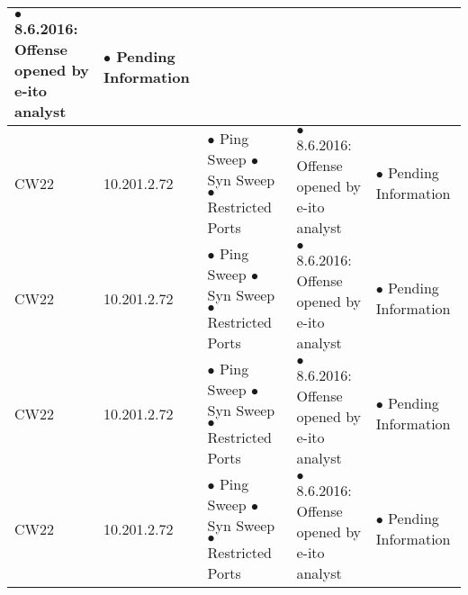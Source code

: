 \begin{center}
\begin{longtable}{|p{2cm}|p{}|p{4cm}|p{6cm}|p{4cm}|}
$\bullet$ 8.6.2016: Offense opened by e-ito analyst & %

$\bullet$ Pending Information %
\\
\hline %
CW22 & %

10.201.2.72 & %

$\bullet$ Ping Sweep \newline %
$\bullet$ Syn Sweep \newline
$\bullet$ Restricted Ports &

$\bullet$ 8.6.2016: Offense opened by e-ito analyst & %

$\bullet$ Pending Information %
\\
\hline %
CW22 & %

10.201.2.72 & %

$\bullet$ Ping Sweep \newline %
$\bullet$ Syn Sweep \newline
$\bullet$ Restricted Ports &

$\bullet$ 8.6.2016: Offense opened by e-ito analyst & %

$\bullet$ Pending Information %
\\
\hline %
CW22 & %

10.201.2.72 & %

$\bullet$ Ping Sweep \newline %
$\bullet$ Syn Sweep \newline
$\bullet$ Restricted Ports &

$\bullet$ 8.6.2016: Offense opened by e-ito analyst & %

$\bullet$ Pending Information %
\\
\hline %
CW22 & %

10.201.2.72 & %

$\bullet$ Ping Sweep \newline %
$\bullet$ Syn Sweep \newline
$\bullet$ Restricted Ports &

$\bullet$ 8.6.2016: Offense opened by e-ito analyst & %

$\bullet$ Pending Information %
\\
\hline






\end{longtable}
\end{center} 
